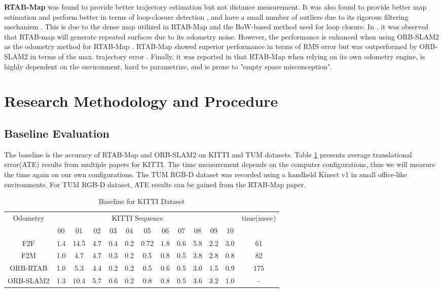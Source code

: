 \documentclass[12pt]{article}
\begin{document}
\indent\textbf{RTAB-Map} was found to provide better trajectory estimation but not distance measurement. It was also found to provide better map estimation and perform better in terms of loop-closure detection \cite{8806213}, and have a small number of outliers due to its rigorous filtering mechanism \cite{8250081}. This is due to the dense map utilized in RTAB-Map and the BoW-based method used for loop closure. In \cite{8250081}, it was observed that RTAB-map will generate repeated surfaces due to its odometry noise. However, the performance is enhanced when using ORB-SLAM2 as the odometry method for RTAB-Map \cite{labbe2019rtab}. RTAB-Map showed superior performance in terms of RMS error but was outperformed by ORB-SLAM2 in terms of the max. trajectory error \cite{8710464}. Finally, it was reported in \cite{study2018} that RTAB-Map when relying on its own odometry engine, is highly dependent on the environment, hard to parametrize, and is prone to "empty space misconception".  
\section{Research Methodology and Procedure}
\subsection{Baseline Evaluation}
The baseline is the accuracy of RTAB-Map and ORB-SLAM2 on KITTI and TUM datasets. Table \ref{tab:my-table} presents average translational error(ATE) results from multiple papers for KITTI\cite{labbe2019rtab}. The time measurement depends on the computer configurations, thus we will measure the time again on our own configurations. The TUM RGB-D dataset was recorded using a handheld Kinect v1 in small office-like environments\cite{sturm12iros}. For TUM RGB-D dataset, ATE results can be gained from the RTAB-Map paper\cite{labbe2019rtab}.
\begin{table}[]
    \centering
    \begin{tabular}{@{}ccccccccccccc@{}}
    \toprule
    Odometry  & \multicolumn{10}{c}{KITTI Sequence}                         &     & time(msec)   \\
              & 00  & 01   & 02  & 03  & 04  & 05   & 06  & 07  & 08  & 09  & 10  &     \\ \midrule
    F2F       & 1.4 & 14.5 & 4.7 & 0.4 & 0.2 & 0.72 & 1.8 & 0.6 & 5.8 & 2.2 & 3.0 & 61  \\ \midrule
    F2M       & 1.0 & 4.7  & 4.7 & 0.3 & 0.2 & 0.5  & 0.8 & 0.5 & 3.8 & 2.8 & 0.8 & 82  \\ \midrule
    ORB-RTAB  & 1.0 & 5.3  & 4.4 & 0.2 & 0.2 & 0.5  & 0.6 & 0.5 & 3.0 & 1.5 & 0.9 & 175 \\ \midrule
    ORB-SLAM2 & 1.3 & 10.4 & 5.7 & 0.6 & 0.2 & 0.8  & 0.8 & 0.5 & 3.6 & 3.2 & 1.0 & -   \\ \bottomrule
    \end{tabular}
    \caption{Baseline for KITTI Dataset}
    \label{tab:my-table}
    \end{table}
\end{document}
